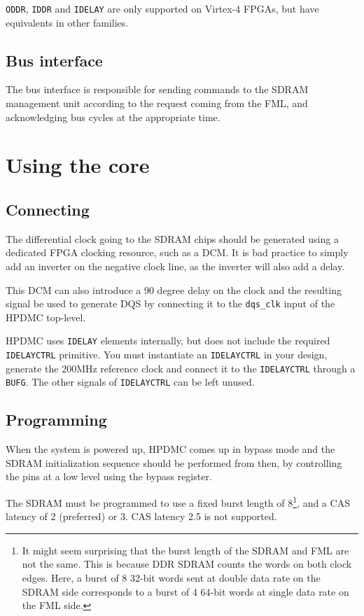 \documentclass[a4paper,11pt]{article}
\begin{document}
\verb!ODDR!, \verb!IDDR! and \verb!IDELAY! are only supported on Virtex-4 FPGAs, but have equivalents in other families.

\subsection{Bus interface}
The bus interface is responsible for sending commands to the SDRAM management unit according to the request coming from the FML, and acknowledging bus cycles at the appropriate time.

\section{Using the core}
\subsection{Connecting}
The differential clock going to the SDRAM chips should be generated using a dedicated FPGA clocking resource, such as a DCM. It is bad practice to simply add an inverter on the negative clock line, as the inverter will also add a delay.

This DCM can also introduce a 90 degree delay on the clock and the resulting signal be used to generate DQS by connecting it to the \verb!dqs_clk! input of the HPDMC top-level.

HPDMC uses \verb!IDELAY! elements internally, but does not include the required \verb!IDELAYCTRL! primitive. You must instantiate an \verb!IDELAYCTRL! in your design, generate the 200MHz reference clock and connect it to the \verb!IDELAYCTRL! through a \verb!BUFG!. The other signals of \verb!IDELAYCTRL! can be left unused.

\subsection{Programming}
When the system is powered up, HPDMC comes up in bypass mode and the SDRAM initialization sequence should be performed from then, by controlling the pins at a low level using the bypass register.

The SDRAM must be programmed to use a fixed burst length of 8\footnote{It might seem surprising that the burst length of the SDRAM and FML are not the same. This is because DDR SDRAM counts the words on both clock edges. Here, a burst of 8 32-bit words sent at double data rate on the SDRAM side corresponds to a burst of 4 64-bit words at single data rate on the FML side.}, and a CAS latency of 2 (preferred) or 3. CAS latency 2.5 is not supported.
\end{document}

